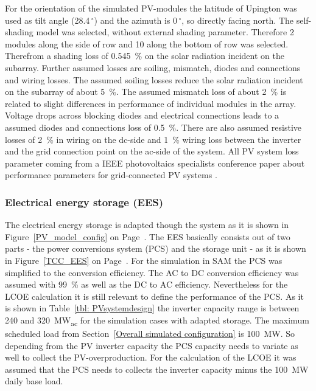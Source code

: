For the orientation of the simulated PV-modules the latitude of Upington was used as tilt angle (28.4$\,^{\circ}$) and the azimuth is 0$\,^{\circ}$, so directly facing north. The self-shading model was selected, without external shading parameter. Therefore 2 modules along the side of row and 10 along the bottom of row was selected. Therefrom a shading loss of 0.545~\% on the solar radiation incident on the subarray. Further assumed losses are soiling, mismatch, diodes and connections and wiring losses. The assumed soiling losses reduce the solar radiation incident on the subarray of about 5~\%. The assumed mismatch loss of about 2~\% is related to slight differences in performance of individual modules in the array. Voltage drops across blocking diodes and electrical connections leads to a assumed diodes and connections loss of 0.5~\%. There are also assumed resistive losses of 2~\% in wiring on the dc-side and 1~\% wiring loss between the inverter and the grid connection point on the ac-side of the system. All PV system loss parameter coming from a IEEE photovoltaics specialists conference paper about performance parameters for grid-connected PV systems \cite{Marion2005}.
\subsubsection{Electrical energy storage (EES)}
The electrical energy storage is adapted though the system as it is shown in Figure~\ref{PV_model_config} on Page~\pageref{PV_model_config}. The EES basically consists out of two parts - the power conversions system (PCS) and the storage unit - as it is shown in Figure~\ref{TCC_EES} on Page~\pageref{TCC_EES}. For the simulation in SAM the PCS was simplified to the conversion efficiency. The AC to DC conversion efficiency was assumed with 99~\% as well as the DC to AC efficiency. Nevertheless for the LCOE calculation it is still relevant to define the performance of the PCS. As it is shown in Table~\ref{tbl: PVsystemdesign} the inverter capacity range is between 240 and 320~MW\textsubscript{ac} for the simulation cases with adapted storage. The maximum scheduled load from Section~\ref{Overall simulated configuration} is 100~MW. So depending from the PV inverter capacity the PCS capacity needs to variate as well to collect the  PV-overproduction. For the calculation of the LCOE it was assumed that the PCS needs to collects the inverter capacity minus the 100~MW daily base load.



